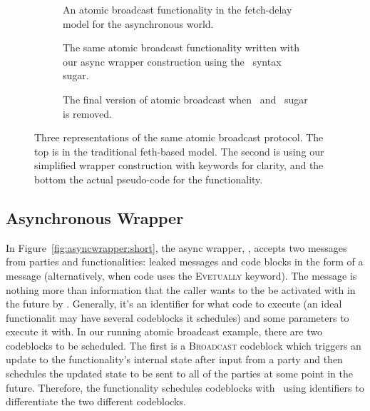 \begin{figure}
\begin{subfigure}{\columnwidth}
	
	\caption{An atomic broadcast functionality in the fetch-delay model for the asynchronous world.}
	\label{fig:atomic:old}
\end{subfigure}
\begin{subfigure}{\columnwidth}
	
	\caption{The same atomic broadcast functionality written with our async wrapper construction using the \Eventually~syntax sugar.}
	\label{fig:atomic:new}
\end{subfigure}
\begin{subfigure}{\columnwidth}
	
	\caption{The final version of atomic broadcast when \Leak~and \Eventually~sugar is removed.}
	\label{fig:atomic:real}
\end{subfigure}
\caption{Three representations of the same atomic broadcast protocol. The top is in the traditional feth-based model. The second is using our simplified wrapper construction with keywords for clarity, and the bottom the actual pseudo-code for the functionality.}
\label{fig:fatomic}
\end{figure}

\subsection{Asynchronous Wrapper}
In Figure~\ref{fig:asyncwrapper:short}, the async wrapper, \Wasync, accepts two messages from parties and functionalities: leaked messages and code blocks in the form of a  message (alternatively, when code uses the \textsc{Evetually} keyword).
The  message is nothing more than information that the caller wants to the be activated with in the future by \Wasync.
Generally, it's an identifier for what code to execute (an ideal functionalit may have several codeblocks it schedules) and some parameters to execute it with.
In our running atomic broadcast example, there are two codeblocks to be scheduled.
The first is a \textsc{Broadcast} codeblock which triggers an update to the functionality's internal state after input from a party and then schedules the updated state to be sent to all of the parties at some point in the future.
Therefore, the functionality schedules codeblocks with \Wasync~using identifiers to differentiate the two different codeblocks.

